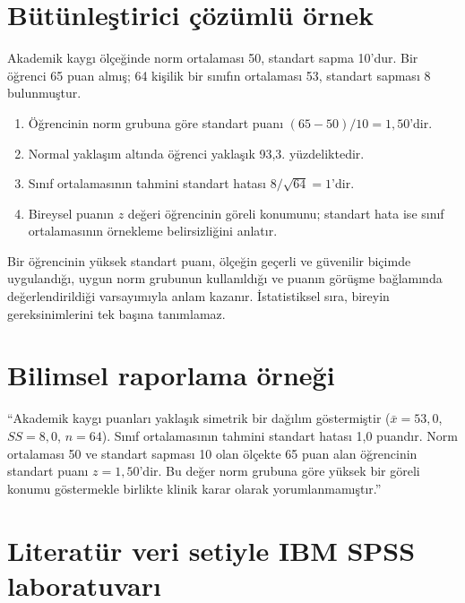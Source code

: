 \section{Bütünleştirici çözümlü örnek}

Akademik kaygı ölçeğinde norm ortalaması 50, standart sapma 10'dur. Bir
öğrenci 65 puan almış; 64 kişilik bir sınıfın ortalaması 53, standart sapması
8 bulunmuştur.

\begin{enumerate}
  \item Öğrencinin norm grubuna göre standart puanı $(65-50)/10=1{,}50$'dir.
  \item Normal yaklaşım altında öğrenci yaklaşık 93,3. yüzdeliktedir.
  \item Sınıf ortalamasının tahmini standart hatası $8/\sqrt{64}=1$'dir.
  \item Bireysel puanın $z$ değeri öğrencinin göreli konumunu; standart hata ise sınıf ortalamasının örnekleme belirsizliğini anlatır.
\end{enumerate}

\begin{researchbox}
Bir öğrencinin yüksek standart puanı, ölçeğin geçerli ve güvenilir biçimde
uygulandığı, uygun norm grubunun kullanıldığı ve puanın görüşme bağlamında
değerlendirildiği varsayımıyla anlam kazanır. İstatistiksel sıra, bireyin
gereksinimlerini tek başına tanımlamaz.
\end{researchbox}

\section{Bilimsel raporlama örneği}

``Akademik kaygı puanları yaklaşık simetrik bir dağılım göstermiştir
($\bar{x}=53{,}0$, $SS=8{,}0$, $n=64$). Sınıf ortalamasının tahmini standart
hatası 1,0 puandır. Norm ortalaması 50 ve standart sapması 10 olan ölçekte 65
puan alan öğrencinin standart puanı $z=1{,}50$'dir. Bu değer norm grubuna göre
yüksek bir göreli konumu göstermekle birlikte klinik karar olarak
yorumlanmamıştır.''

\section{Literatür veri setiyle IBM SPSS laboratuvarı}

